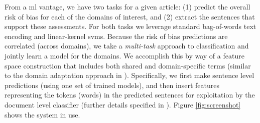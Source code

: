 \documentclass[runningheads,a4paper]{llncs}
\begin{document}
From a \ac{ml} vantage, we have two tasks for a given article: (1) predict the overall risk of bias for each of the domains of interest, and (2) extract the sentences that support these assessments.
For both tasks we leverage standard bag-of-words text encoding and linear-kernel \acp{svm}.
Because the risk of bias predictions are correlated (across domains), we take a \emph{multi-task} \cite{evgeniou2004} approach to classification and jointly learn a model for the domains.
We accomplish this by way of a feature space construction that includes both shared and domain-specific terms (similar to the domain adaptation approach in \cite{daume2007}).
Specifically, we first make sentence level predictions (using one set of trained models), and then insert features representing the tokens (words) in the predicted sentences for exploitation by the document level classifier (further details specified in \cite{marshall2014}).
Figure \ref{fig:screenshot} shows the system in use.


\end{document}
